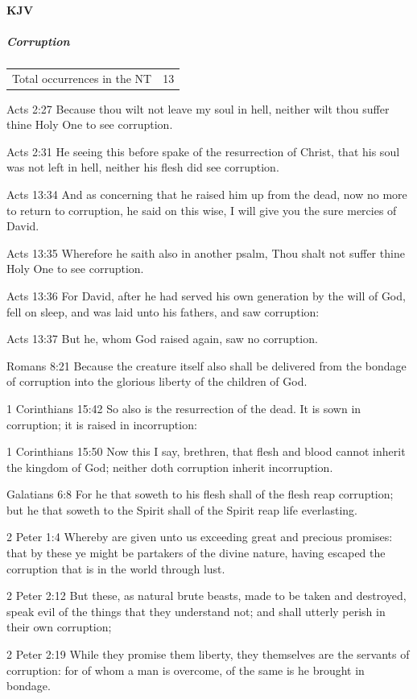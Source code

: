		\paragraph{KJV}
			\label{CORRUPTION-NT-KJV}
			
			\subparagraph{Corruption}
	
				\begin{tabular}{ll}
					Total occurrences in the NT & 13
				\end{tabular}
				
				\begin{compactdesc}
					\item[Acts 2:27] Because thou wilt not leave my soul in hell, neither wilt thou suffer thine Holy One to see corruption.
					\item[Acts 2:31] He seeing this before spake of the resurrection of Christ, that his soul was not left in hell, neither his flesh did see corruption.
					\item[Acts 13:34] And as concerning that he raised him up from the dead, now no more to return to corruption, he said on this wise, I will give you the sure mercies of David.
					\item[Acts 13:35] Wherefore he saith also in another psalm, Thou shalt not suffer thine Holy One to see corruption.
					\item[Acts 13:36] For David, after he had served his own generation by the will of God, fell on sleep, and was laid unto his fathers, and saw corruption:
					\item[Acts 13:37] But he, whom God raised again, saw no corruption.
					\item[Romans 8:21] Because the creature itself also shall be delivered from the bondage of corruption into the glorious liberty of the children of God.
					\item[1 Corinthians 15:42] So also is the resurrection of the dead. It is sown in corruption; it is raised in incorruption:
					\item[1 Corinthians 15:50] Now this I say, brethren, that flesh and blood cannot inherit the kingdom of God; neither doth corruption inherit incorruption.
					\item[Galatians 6:8] For he that soweth to his flesh shall of the flesh reap corruption; but he that soweth to the Spirit shall of the Spirit reap life everlasting.
					\item[2 Peter 1:4] Whereby are given unto us exceeding great and precious promises: that by these ye might be partakers of the divine nature, having escaped the corruption that is in the world through lust.
					\item[2 Peter 2:12] But these, as natural brute beasts, made to be taken and destroyed, speak evil of the things that they understand not; and shall utterly perish in their own corruption;
					\item[2 Peter 2:19] While they promise them liberty, they themselves are the servants of corruption: for of whom a man is overcome, of the same is he brought in bondage.
				\end{compactdesc}
			
